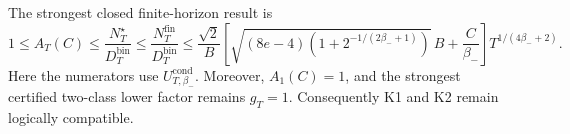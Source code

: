 The strongest closed finite-horizon result is
\[
1\le A_T(C)\le\frac{N_T^\star}{D_T^{\mathrm{bin}}}\le\frac{N_T^{\mathrm{fin}}}{D_T^{\mathrm{bin}}}\le\frac{\sqrt2}{B}\left[\sqrt{(8e-4)\left(1+2^{-1/(2\beta_-+1)}\right)}\,B+\frac C{\beta_-}\right]T^{1/(4\beta_-+2)}.
\]
Here the numerators use \(U_{T,\beta_-}^{\mathrm{cond}}\). Moreover, \(A_1(C)=1\), and the strongest certified two-class lower factor remains \(g_T=1\). Consequently K1 and K2 remain logically compatible.